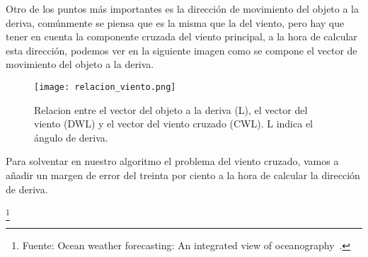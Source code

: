 Otro de los puntos más importantes es la dirección de movimiento del 
objeto a la deriva, comúnmente se piensa que es la misma que la del viento,
 pero hay que tener en cuenta la componente cruzada del viento principal, a
 la hora de calcular esta dirección, podemos ver en la siguiente imagen como 
se compone el vector de movimiento del objeto a la deriva.


\begin{figure}[h]
\texttt{[image: relacion\_viento.png]} 
\caption{Relacion entre el vector del objeto a la deriva (L), 
el vector del viento (DWL) y el vector del viento cruzado (CWL). L indica el ángulo de deriva. }
\end{figure}


Para solventar en nuestro algoritmo el problema del viento cruzado, vamos a añadir un margen de 
error del treinta por ciento a la hora de calcular la dirección de deriva. 

\footnote{Fuente: Ocean weather forecasting: An integrated view of oceanography~\cite{DDERIVA}.}